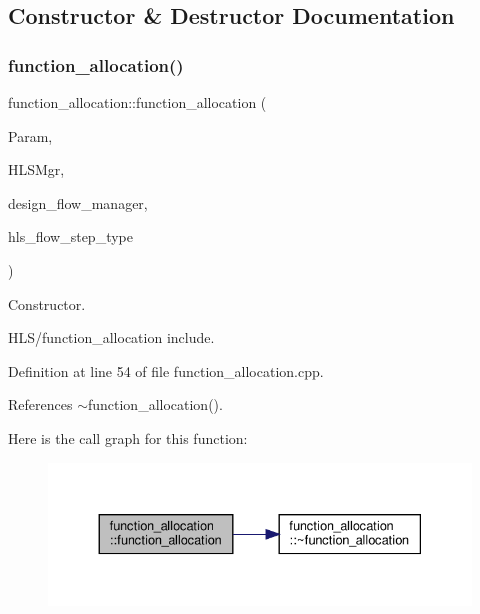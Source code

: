 \subsection{Constructor \& Destructor Documentation}
\mbox{\label{classfunction__allocation_a95a2089801528c281abdf8188b0c8d1f}} 
\subsubsection{\texorpdfstring{function\+\_\+allocation()}{function\_allocation()}}
{\footnotesize\ttfamily function\+\_\+allocation\+::function\+\_\+allocation (\begin{DoxyParamCaption}\item[{const \hyperlink{Parameter_8hpp_a37841774a6fcb479b597fdf8955eb4ea}{Parameter\+Const\+Ref}}]{Param,  }\item[{const \hyperlink{hls__manager_8hpp_acd3842b8589fe52c08fc0b2fcc813bfe}{H\+L\+S\+\_\+manager\+Ref}}]{H\+L\+S\+Mgr,  }\item[{const Design\+Flow\+Manager\+Const\+Ref}]{design\+\_\+flow\+\_\+manager,  }\item[{const \hyperlink{hls__step_8hpp_ada16bc22905016180e26fc7e39537f8d}{H\+L\+S\+Flow\+Step\+\_\+\+Type}}]{hls\+\_\+flow\+\_\+step\+\_\+type }\end{DoxyParamCaption})}



Constructor. 

H\+L\+S/function\+\_\+allocation include. 

Definition at line 54 of file function\+\_\+allocation.\+cpp.



References $\sim$function\+\_\+allocation().

Here is the call graph for this function\+:
\nopagebreak
\begin{figure}[H]
\begin{center}
\leavevmode
\includegraphics[width=330pt]{de/d0f/classfunction__allocation_a95a2089801528c281abdf8188b0c8d1f_cgraph}
\end{center}
\end{figure}
\mbox{\label{classfunction__allocation_a2d9c00c0efcdf85095888b683d6a5054}} 
